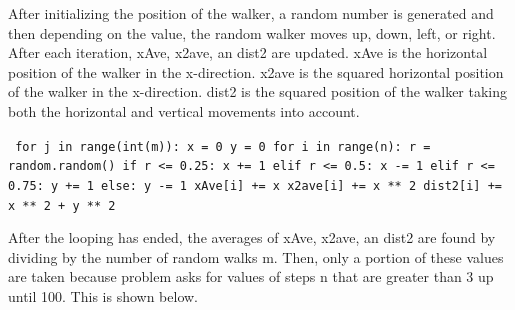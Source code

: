 \documentclass[notitlepage,aps,prd,nofootinbib]{revtex4-1}
\begin{document}
\noindent After initializing the position of the walker, a random number is generated and then depending on the value, the random walker moves up, down, left, or right. After each iteration, xAve, x2ave, an dist2 are updated. xAve is the horizontal position of the walker in the x-direction. x2ave is the squared horizontal position of the walker in the x-direction. dist2 is the squared position of the walker taking both the horizontal and vertical movements into account. \newline
 

{\tt 	
\noindent for j in range(int(m)):           \newline
\indent x = 0                           \newline           
\indent	y = 0                                   \newline        
	\indent	for i in range(n):                  \newline
\indent	\indent	r = random.random()             \newline
\indent	\indent	if r <= 0.25:                           \newline
\indent	\indent \indent	x += 1                                  \newline
\indent	\indent	elif r <= 0.5:                          \newline
\indent	\indent \indent	x -= 1                                  \newline
\indent	\indent	elif r <= 0.75:                         \newline
\indent	\indent \indent	y += 1                                  \newline
\indent	\indent	else:                                   \newline
\indent	\indent \indent	y -= 1                                  \newline
\indent	\indent	xAve[i] += x                            \newline               
\indent	\indent	x2ave[i] += x ** 2                      \newline
\indent	\indent	dist2[i] += x ** 2 + y ** 2             \newline
		}

\noindent After the looping has ended, the averages of xAve, x2ave, an dist2 are found by dividing by the number of random walks m. Then, only a portion of these values are taken because problem asks for values of steps n that are greater than 3 up until 100. This is shown below. \newline 
\end{document}
